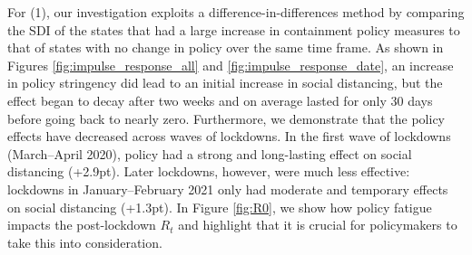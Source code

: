\documentclass[dvipsnames]{article}
\begin{document}
For (1), our investigation exploits a difference-in-differences 
method by comparing the SDI of the states that had a large increase in containment policy measures to that of states with no change in policy over the same time frame. 
As shown in Figures \ref{fig:impulse_response_all} and \ref{fig:impulse_response_date}, an increase in policy stringency did lead to an initial increase in social distancing, but the effect began to decay after two weeks and on average lasted for only 30 days before going back to nearly zero.
Furthermore, we demonstrate that the policy effects have decreased across waves of lockdowns. In the first wave of lockdowns (March--April 2020), policy had a strong and long-lasting effect on social distancing (+2.9pt). Later lockdowns, however, were much less effective: lockdowns in January--February 2021 only had moderate and temporary effects on social distancing (+1.3pt). In Figure \ref{fig:R0}, we show how policy fatigue impacts the post-lockdown $R_t$ and highlight that it is crucial for policymakers to take this into consideration. 
\end{document}
